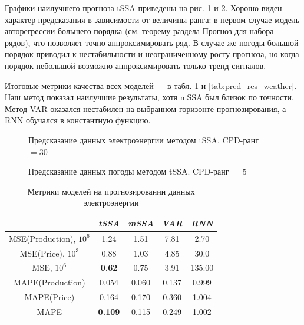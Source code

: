 			Графики наилучшего прогноза tSSA приведены на рис. \ref{fig:tssa_electr_pred} и \ref{fig:tssa_weather_pred}. Хорошо виден характер предсказания в зависимости от величины ранга: в первом случае модель авторегрессии большего порядка (см. теорему раздела Прогноз для набора рядов), что позволяет точно аппроксимировать ряд. В случае же погоды большой порядок приводил к нестабильности и неограниченному росту прогноза, но когда порядок небольшой возможно аппроксимировать только тренд сигналов.
			
			Итоговые метрики качества всех моделей --- в табл. \ref{tab:pred_res_electr} и \ref{tab:pred_res_weather}. Наш метод показал наилучшие результаты, хотя mSSA был близок по точности. Метод VAR оказался нестабилен на выбранном горизонте прогнозирования, а RNN обучался в константную функцию.
			
			\begin{figure}[h!]
				\centering
				\caption{Предсказание данных электроэнергии методом tSSA. CPD-ранг $ = 30 $}\label{fig:tssa_electr_pred}
			\end{figure}
			
			\begin{figure}[h!]
				\centering
				\caption{Предсказание данных погоды методом tSSA. CPD-ранг $ = 5 $}\label{fig:tssa_weather_pred}
			\end{figure}
			
			\begin{table}[h!]
				\centering
				\caption{Метрики моделей на прогнозировании данных электроэнергии}\label{tab:pred_res_electr}
				\begin{tabular}{|c|c|c|c|c|}
					\hline
					& \textit{tSSA}  & \textit{mSSA} & \textit{VAR} & \textit{RNN} \\ \hline
					MSE(Production), $10^6$ & 1.24           & 1.51          & 7.81         & 2.70         \\ \hline
					MSE(Price), $10^3$      & 0.88           & 1.03          & 4.85         & 30.0         \\ \hline
					MSE, $10^6$             & \textbf{0.62}  & 0.75          & 3.91         & 135.00       \\ \hline
					MAPE(Production)        & 0.054          & 0.060         & 0.137        & 0.999        \\ \hline
					MAPE(Price)             & 0.164          & 0.170         & 0.360        & 1.004        \\ \hline
					MAPE                    & \textbf{0.109} & 0.115         & 0.249        & 1.002        \\ \hline
				\end{tabular}
			\end{table}
			
